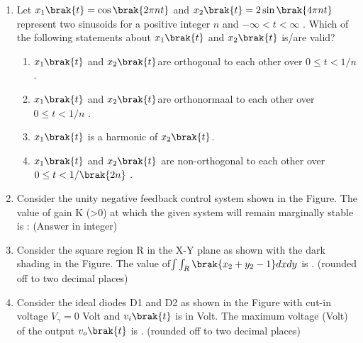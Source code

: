 \begin{enumerate}[label=\thesubsection.\arabic*,ref=\thesubsection.\theenumi]
\item Let $x_1 \brak{t} = \cos\brak{2\pi n t}$ and $x_2\brak{t} = 2\sin\brak{4\pi n t}$ represent two sinusoids
for a positive integer $n$ and $-\infty< t< \infty$ .
Which of the following statements about $x_1\brak{t}$ and $x_2\brak{t}$ is/are valid? 
\begin{enumerate}
	\item $x_1 \brak{t}$ and $x_2 \brak{t}$are orthogonal to each other over $0 \leq t < 1/n$ . 
	\item $x_1 \brak{t}$ and $x_2 \brak{t}$are orthonormaal to each other over $0 \leq t < 1/n$ .
	\item $x_1 \brak{t}$ is a harmonic of $x_2 \brak{t}$.
	\item $x_1 \brak{t}$ and $x_2 \brak{t}$ are non-orthogonal to each other over $0 \leq t < 1/\brak{2n}$ .
\end{enumerate}
\item Consider the unity negative feedback control system shown in the Figure.
The value of gain K (>0) at which the given system will remain marginally stable
is :
(Answer in integer)
\item Consider the square region R in the X-Y plane as shown with the dark shading in
	the Figure. The value of$\int\int_{R} \brak{x_2 + y_2 - 1}dxdy$ is .
(rounded off to two decimal places) 
\item Consider the ideal diodes D1 and D2 as shown in the Figure with cut-in voltage
	$V_\gamma = 0$ Volt and $v_i\brak{t}$ is in Volt.
		The maximum voltage (Volt) of the output $v_o\brak{t}$ is .
(rounded off to two decimal places)
\end{enumerate}

